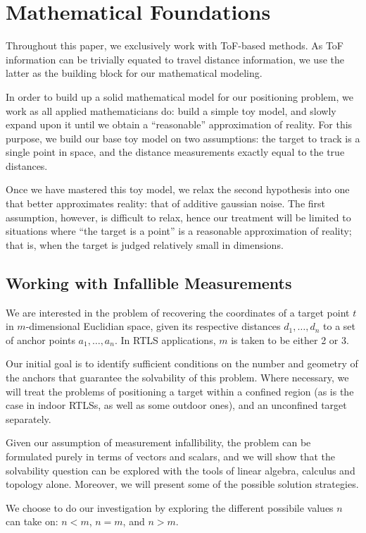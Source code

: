 \section{Mathematical Foundations}
Throughout this paper, we exclusively work with ToF-based methods. As ToF information can be trivially equated to travel distance information, we use the latter as the building block for our mathematical modeling.

In order to build up a solid mathematical model for our positioning problem, we work as all applied mathematicians do: build a simple toy model, and slowly expand upon it until we obtain a ``reasonable'' approximation of reality.
For this purpose, we build our base toy model on two assumptions: the target to track is a single point in space, and the distance measurements exactly equal to the true distances.


Once we have mastered this toy model, we relax the second hypothesis into one that better approximates reality: that of additive gaussian noise. The first assumption, however, is difficult to relax, hence our treatment will be limited to situations where ``the target is a point'' is a reasonable approximation of reality; that is, when the target is judged relatively small in dimensions.

\subsection{Working with Infallible Measurements}
We are interested in the problem of recovering the coordinates of a target point $t$ in $m$-dimensional Euclidian space, given its respective distances $d_1, \dots, d_n$ to a set of anchor points $a_1, \dots, a_n$. In RTLS applications, $m$ is taken to be either 2 or 3.

Our initial goal is to identify sufficient conditions on the number and geometry of the anchors that guarantee the solvability of this problem. Where necessary, we will treat the problems of positioning a target within a confined region (as is the case in indoor RTLSs, as well as some outdoor ones), and an unconfined target separately.

Given our assumption of measurement infallibility, the problem can be formulated purely in terms of vectors and scalars, and we will show that the solvability question can be explored with the tools of linear algebra, calculus and topology alone. Moreover, we will present some of the possible solution strategies.

We choose to do our investigation by exploring the different possibile values $n$ can take on: $n<m$, $n=m$, and $n>m$.

